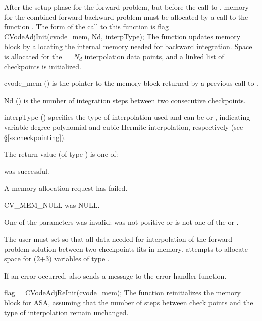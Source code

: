 After the setup phase for the forward problem, but before the call
to , memory for the combined forward-backward problem must be
allocated by a call to the function .
The form of the call to this function is
{
  flag = CVodeAdjInit(cvode\_mem, Nd, interpType);
}
{
  The function  updates {\cvodes} memory block by allocating 
  the internal memory needed for backward integration.
  Space is allocated for the  $= N_d$ interpolation data points, and a linked 
  list of checkpoints is initialized.
}
{
  \begin{args}[interpType]
  \item[cvode\_mem] () 
    is the pointer to the {\cvodes} memory block returned by a previous call to
    .
  \item[Nd] () 
    is the number of integration steps between two consecutive checkpoints.
  \item[interpType] ()
    specifies the type of interpolation used and can be 
    or , indicating variable-degree polynomial and cubic Hermite
    interpolation, respectively (see \S\ref{ss:checkpointing}).
  \end{args}
}
{
   The return value  (of type ) is one of:
   \begin{args}
   \item[\Id{CV\_SUCCESS}] 
      was successful.
   \item[\Id{CV\_MEM\_FAIL}]
     A memory allocation request has failed.
   \item[CV\_MEM\_NULL] 
      was NULL.
   \item[\Id{CV\_ILL\_INPUT}]
     One of the parameters was invalid:  was not positive or 
     is not one of the  or .
   \end{args}
}
{
  The user must set  so that all data needed for interpolation of the 
  forward problem solution between two checkpoints fits in memory. 
  attempts to allocate space for $(2$$+3)$ variables of type .

  If an error occurred,  also sends a message to the
  error handler function.
}
{
  flag = CVodeAdjReInit(cvode\_mem);
}
{
  The function  reinitializes the {\cvodes} memory
  block for ASA, assuming that the number of steps between check
  points and the type of interpolation remain unchanged.
}
